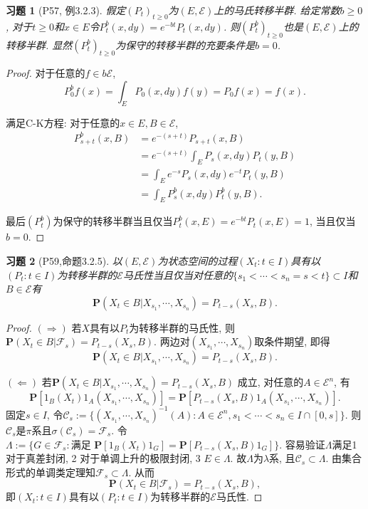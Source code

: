 \documentclass[UTF8,ondside]{ctexart}
\newtheorem{exercise}{习题}[section]
\newcommand{\h}{\mathscr}
\newcommand{\mbf}{\mathbf}
\newcommand{\circlenumber}[1]{{\small\textcircled{\tiny{#1}}}}
\numberwithin{equation}{section}
\begin{document}
	\begin{exercise}[P57, 例3.2.3]
		假定$(P_t)_{t\geq 0}$为$(E,\h E)$上的马氏转移半群. 给定常数$b\geq 0$, 对于$t\geq 0$和$x\in E$令$P_t^b(x,dy)=e^{-bt}P_t(x,dy)$. 则$(P_t^b)_{t\geq 0}$也是$(E,\h E)$上的转移半群. 显然$(P_t^b)_{t\geq 0}$为保守的转移半群的充要条件是$b=0$.
	\end{exercise}
	\begin{proof}
		对于任意的$f\in b\h E$,
		\[
			P_0^b f(x)=\int_E P_0(x,dy)f(y)=P_0 f(x)=f(x).
		\]

		满足C-K方程: 对于任意的$x\in E,B\in \h E$, 
		\[\begin{aligned}
			P_{s+t}^b(x,B)&=e^{-(s+t)}P_{s+t}(x,B)\\
			&=e^{-(s+t)}\int_E P_s(x,dy)P_t(y,B)\\
			&=\int_E e^{-s}P_s(x,dy)e^{-t}P_t(y,B)\\
			&=\int_E P_s^b(x,dy)P_t^b(y,B).	
		\end{aligned}
		\]

		最后$(P_t^b)$为保守的转移半群当且仅当$P_t^b(x,E)=e^{-bt}P_t(x,E)=1$, 当且仅当$b=0$. 
	\end{proof}
	\begin{exercise}[P59,命题3.2.5]
		以$(E,\h E)$为状态空间的过程$(X_t:t\in I)$具有以$(P_t:t\in I)$为转移半群的$\h E$马氏性当且仅当对任意的$\{s_1<\cdots<s_n=s<t\}\subset I$和$B\in \h E$有 
		\[
			\mbf P(X_t\in B|X_{s_1},\cdots,X_{s_n})=P_{t-s}(X_s,B).
		\]
	\end{exercise}
		\begin{proof}
			$(\Rightarrow)$ 若$X$具有以$P_t$为转移半群的马氏性, 则$\mbf P(X_t\in B|\h F_s)=P_{t-s}(X_s,B)$. 两边对$(X_{s_1},\cdots,X_{s_n})$取条件期望, 即得
			\[
				\mbf P(X_t\in B|X_{s_1},\cdots,X_{s_n})=P_{t-s}(X_s,B).
			\]

			$(\Leftarrow)$ 若$\mbf P(X_t\in B|X_{s_1},\cdots,X_{s_n})=P_{t-s}(X_s,B)$ 成立, 对任意的$A\in \h E^n$, 有
			\[
				\mbf P[1_B(X_t)1_A(X_{s_1},\cdots,X_{s_n})]=
				\mbf P[P_{t-s}(X_s,B)1_A(X_{s_1},\cdots,X_{s_n})].
			\]
			固定$s\in I$, 令$\h C_s:=\{(X_{s_1},\cdots,X_{s_n})^{-1}(A):A\in \h E^n, s_1<\cdots<s_n\in I\cap [0,s]\}$. 则$\h C_s$是$\pi$系且$\sigma(\h C_s)=\h F_s$. 令$\Lambda:=\{G\in\h F_s:\text{满足\ } \mbf P[1_B(X_t)1_G]=\mbf P[P_{t-s}(X_s,B)1_G]\}$. 容易验证$\Lambda$满足\circlenumber{1} 对于真差封闭, \circlenumber{2} 对于单调上升的极限封闭, \circlenumber{3} $E\in \Lambda$. 故$\Lambda$为$\lambda$系, 且$\h C_s\subset \Lambda$. 由集合形式的单调类定理知$\h F_s\subset \Lambda$. 从而
			\[
				\mbf P(X_t\in B|\h F_s)=P_{t-s}(X_s,B),
			\]
			即$(X_t:t\in I)$具有以$(P_t:t\in I)$为转移半群的$\h E$马氏性. 
		\end{proof}
\end{document}
